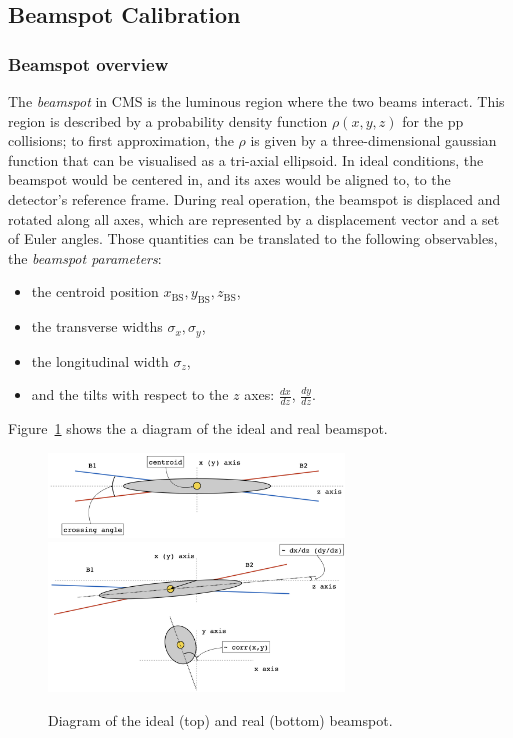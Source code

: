 \subsection{Beamspot Calibration}

\subsubsection{Beamspot overview}

The \emph{beamspot} in CMS is the luminous region where the two beams interact.
This region is described by a probability density function $\rho(x,y,z)$ for the pp collisions;
to first approximation, the $\rho$ is given by a three-dimensional gaussian function that can be visualised as a tri-axial ellipsoid.
In ideal conditions, the beamspot would be centered in,
and its axes would be aligned to,
to the detector's reference frame.
During real operation, the beamspot is displaced and rotated along all axes,
which are represented by a displacement vector and a set of Euler angles.
Those quantities can be translated to the following observables, the \emph{beamspot parameters}:
\begin{itemize}
\item the centroid position $x_{\text{BS}}, y_{\text{BS}}, z_{\text{BS}}$,
\item the transverse widths $\sigma_{x}, \sigma_{y}$,
\item the longitudinal width $\sigma_{z}$,
\item and the tilts with respect to the $z$ axes: $\frac{dx}{dz}$, $\frac{dy}{dz}$.
\end{itemize}
Figure~\ref{fig:beamspotCartoon} shows the a diagram of the ideal and real beamspot.
\begin{figure}[htbp]
   \centering
\includegraphics[width=0.7\textwidth]{figures/IdealBeamspot.png}\\[2ex]
\includegraphics[width=0.7\textwidth]{figures/RealBeamspot.png}
   \caption{Diagram of the ideal (top) and real (bottom) beamspot.}
   \label{fig:beamspotCartoon}
\end{figure}


